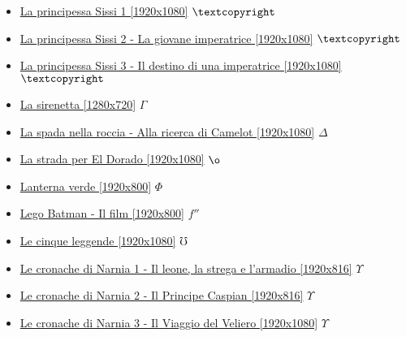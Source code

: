 \begin{itemize}
			\item \href{https://mega.nz/#!uCwhDSqa!1a4kYaAD_d8gp453Soyuvb3LjuEW-w1zlrcTm_YCCRA} {La principessa Sissi 1 [1920x1080]}  $\textcopyright$ \\ 	
			\item \href{https://mega.nz/#!LbJGgbaZ!S8lkzNLtyhi_NbfQSyQgO7MHxandxdOiUC8JxAeCmCA} {La principessa Sissi 2 - La giovane imperatrice [1920x1080]}  $\textcopyright$ \\ 	
			\item \href{https://mega.nz/#!PSoj0CQS!eUjHrWAgr34U3YpXhIm-Q7HPG7Z7yUD_t-6Fpx7RUxc} {La principessa Sissi 3 - Il destino di una imperatrice [1920x1080]}  $\textcopyright$ \\ 	
			\item \href{https://mega.nz/#!R4VyECbY!6mc-nT_fzB4X9efvbX7gzW1N1xVCUiqORx5uK4SqYjA} {La sirenetta [1280x720]}  $\Gamma$ \\ 
			\item \href{https://mega.nz/#!BrQ1FSBT!Tta6SjCQQsmxKHPKTXPieqMvitKBZX9hs3rn7uMh1Z0} {La spada nella roccia - Alla ricerca di Camelot [1920x1080]}  $\varDelta$ \\ 
			\item \href{https://mega.nz/#!Q5hTEAAS!Q2WD_-Qw9efyOuKJI-M8UzK6u9MXJeY6qDwYVWmQpxk} {La strada per El Dorado [1920x1080]}  $\o$ \\ 
			\item \href{https://mega.nz/#!dO5hFCbB!wA_msYo_UexKrcBH2qQ_AxOmfUq-uzNiqMlfmXh_nDE} {Lanterna verde [1920x800]}  $\Phi$ \\ 
			\item \href{https://mega.nz/#!qD4GnQBZ!HaqIkclnW8nxyt8ktUw4Tqyl1jOKeFFIcpy0m7Z0UCk} {Lego Batman - Il film [1920x800]}  $f''$ \\ 
			\item \href{https://mega.nz/#!76ZARLBL!UNhsdj9ndRpX8X9A9OzYxziqvW1EeLhXkMWWjSVpf2s} {Le cinque leggende [1920x1080]}  $\mho$ \\ 
			\item \href{https://mega.nz/#!t2wEnBoI!_8yv72VGkzQGoIpnrKf-kV9YRNbymPnj78wsyZbKb0U} {Le cronache di Narnia 1 - Il leone, la strega e l'armadio [1920x816]}  $\Upsilon$ \\ 
			\item \href{https://mega.nz/#!tugyiCLD!7z6ODO3DzSkG7SrBM4y-Aaw2Iav0Azaw6Vm2Dw49i8w} {Le cronache di Narnia 2 - Il Principe Caspian [1920x816]}  $\Upsilon$ \\ 
			\item \href{https://mega.nz/#!FvZAEDZK!FY7oKIUAcRJlCzzlkSl0tin3UY-TkTLiFAeV6JLmgZY} {Le cronache di Narnia 3 - Il Viaggio del Veliero [1920x1080]}  $\Upsilon$ \\ 	

\end{itemize}
